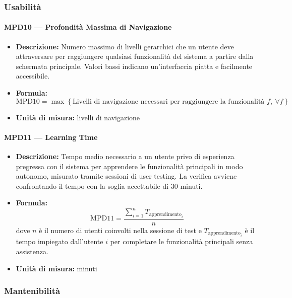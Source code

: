 \documentclass[a4paper,12pt]{article}
\begin{document}
\subsubsection{Usabilità}

\paragraph{MPD10 --- Profondità Massima di Navigazione}
\begin{itemize}
    \item \textbf{Descrizione:} Numero massimo di livelli gerarchici che un utente deve attraversare per raggiungere qualsiasi funzionalità del sistema a partire dalla schermata principale. Valori bassi indicano un'interfaccia piatta e facilmente accessibile.
    \item \textbf{Formula:}
    $$\text{MPD10} = \max \left\{ \text{Livelli di navigazione necessari per raggiungere la funzionalità } f,\ \forall f \right\}$$
    \item \textbf{Unità di misura:} livelli di navigazione
\end{itemize}

\paragraph{MPD11 --- Learning Time}
\begin{itemize}
    \item \textbf{Descrizione:} Tempo medio necessario a un utente privo di esperienza pregressa con il sistema per apprendere le funzionalità principali in modo autonomo, misurato tramite sessioni di user testing. La verifica avviene confrontando il tempo con la soglia accettabile di 30 minuti.
    \item \textbf{Formula:}
    $$\text{MPD11} = \frac{\displaystyle\sum_{i=1}^{n} T_{\text{apprendimento}_i}}{n}$$
    dove $n$ è il numero di utenti coinvolti nella sessione di test e $T_{\text{apprendimento}_i}$ è il tempo impiegato dall'utente $i$ per completare le funzionalità principali senza assistenza.
    \item \textbf{Unità di misura:} minuti
\end{itemize}

\subsubsection{Mantenibilità}
\end{document}
